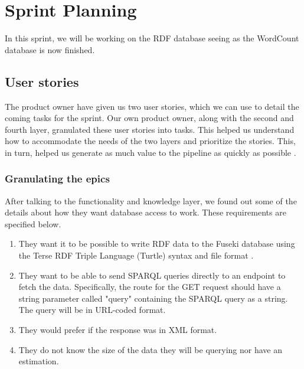 \section{Sprint Planning}\label{section:sprintPlanningSprint5}
In this sprint, we will be working on the RDF database seeing as the WordCount database is now finished.

\subsection*{User stories}\label{sec:userstories5}
The \knox{} product owner have given us two user stories, which we can use to detail the coming tasks for the sprint.
Our own product owner, along with the second and fourth layer, granulated these user stories into tasks.
This helped us understand how to accommodate the needs of the two layers and prioritize the stories.
This, in turn, helped us generate as much value to the pipeline as quickly as possible \cite{UserStories}.


\subsubsection*{Granulating the epics}
After talking to the functionality and knowledge layer, we found out some of the details about how they want database access to work. These requirements are specified below.



\begin{enumerate}
    \item They want it to be possible to write RDF data to the Fuseki database using the Terse RDF Triple Language (Turtle) syntax and file format \cite{TurtleFormat}.
    \item They want to be able to send SPARQL queries directly to an endpoint to fetch the data. Specifically, the route for the GET request should have a string parameter called "query" containing the SPARQL query as a string. The query will be in URL-coded format.
    \item They would prefer if the response was in XML format.
    \item They do not know the size of the data they will be querying nor have an estimation.
\end{enumerate}

